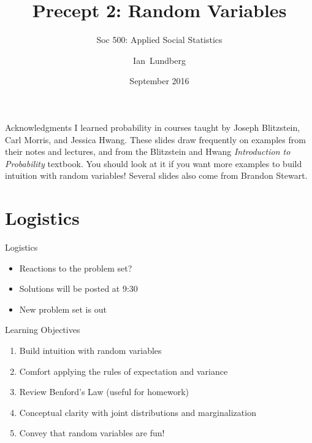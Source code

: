 \documentclass{beamer}
\title{Precept 2: Random Variables}
\subtitle{Soc 500: Applied Social Statistics}
\author{Ian~Lundberg}
\institute[Princeton]{Princeton University}
\date{September 2016}
\begin{document}
\begin{frame}
  \titlepage
\end{frame}

\begin{frame}{Acknowledgments}
I learned probability in courses taught by Joseph Blitzstein, Carl Morris, and Jessica Hwang. These slides draw frequently on examples from their notes and lectures, and from the Blitzstein and Hwang \emph{Introduction to Probability} textbook. You should look at it if you want more examples to build intuition with random variables! Several slides also come from Brandon Stewart.
\end{frame}

\section{Logistics}
\begin{frame}{Logistics}
\begin{itemize}
  \item Reactions to the problem set?
  \item Solutions will be posted at 9:30
  \item New problem set is out
\end{itemize}
\end{frame}

\begin{frame}{Learning Objectives}
\begin{enumerate}
  \item Build intuition with random variables
  \item Comfort applying the rules of expectation and variance
  \item Review Benford's Law (useful for homework)
  \item Conceptual clarity with joint distributions and marginalization
  \item Convey that random variables are fun!
\end{enumerate}
\end{frame}
\end{document}
